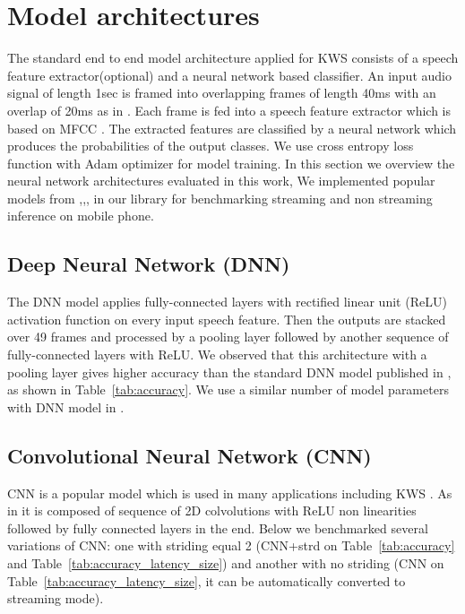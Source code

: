 \documentclass[a4paper]{article}
\begin{document}
\section{Model architectures}

The standard end to end model architecture applied for KWS \cite{DNN1, CNN2} consists of a speech feature extractor(optional) and a neural network based classifier. An input audio signal of length 1sec is framed into overlapping frames of length 40ms with an overlap of 20ms as in \cite{HELLO}. Each frame is fed into a speech feature extractor which is based on MFCC \cite{MFCC}. The extracted features are classified by a neural network which produces the probabilities of the output classes. We use cross entropy loss function with Adam optimizer for model training. In this section we overview the neural network architectures evaluated in this work, We implemented popular models from \cite{HELLO},\cite{ATT2},\cite{SVDF1}, in our library for benchmarking streaming and non streaming inference on mobile phone.

\subsection{Deep Neural Network (DNN)}
The DNN model applies fully-connected layers with rectified linear unit (ReLU) activation function on every input speech feature. Then the outputs are stacked over 49 frames and processed by a pooling layer followed by another sequence of fully-connected layers with ReLU. We observed that this architecture with a pooling layer gives higher accuracy than the standard DNN model published in \cite{HELLO}, as shown in Table~\ref{tab:accuracy}. We use a similar number of model parameters with DNN model in \cite{HELLO}.

\subsection{Convolutional Neural Network (CNN)}
CNN\cite{CNN1} is a popular model which is used in many applications including KWS \cite{CNN1, CNN2, TEMPCONV}. As in \cite{HELLO} it is composed of sequence of 2D colvolutions with ReLU non linearities followed by fully connected layers in the end. Below we benchmarked several variations of CNN: one with striding equal 2 (CNN+strd on Table~\ref{tab:accuracy} and Table~\ref{tab:accuracy_latency_size}) and another with no striding (CNN on Table~\ref{tab:accuracy_latency_size}, it can be automatically converted to streaming mode).
\end{document}
